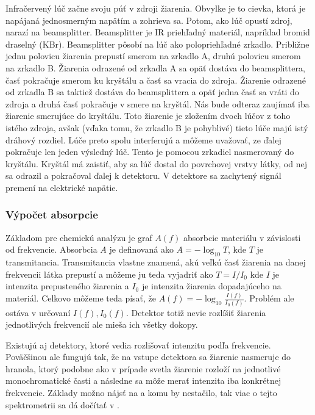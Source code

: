 Infračervený lúč začne svoju púť v zdroji žiarenia. Obvylke je to 
cievka, ktorá je napájaná jednosmerným napätím a zohrieva sa.
Potom, ako lúč opustí zdroj, narazí na beamsplitter. Beamsplitter
je IR priehľadný materiál, napríklad bromid draselný (KBr). 
Beamsplitter pôsobí
na lúč ako polopriehľadné zrkadlo. Približne jednu polovicu žiarenia
prepustí smerom na zrkadlo A, druhú polovicu smerom na zrkadlo B.
Žiarenia odrazené od zrkadla A sa opäť dostáva do beamsplittera,
časť pokračuje smerom ku kryštálu a časť sa vracia do zdroja.
Žiarenie odrazené od zrkadla B sa taktiež dostáva do beamsplittera a
opäť jedna časť sa vráti do zdroja a druhá časť pokračuje v smere na
kryštál. Nás bude odteraz zaujímať iba žiarenie smerujúce do kryštálu.
Toto žiarenie je zložením dvoch lúčov z toho istého zdroja, avšak
(vďaka tomu, že zrkadlo B je pohyblivé) tieto lúče majú istý
dráhový rozdiel. Lúče preto spolu interferujú a môžeme
uvažovať, ze ďalej pokračuje len jeden výsledný lúč.
Tento je pomocou zrkadiel nasmerovaný do kryštálu. Kryštál má zaistiť,
aby sa lúč dostal do povrchovej vrstvy látky, od nej sa odrazil a
pokračoval ďalej k detektoru. V detektore sa zachytený signál
premení na elektrické napätie.


\subsubsection{Výpočet absorpcie}
Základom pre chemickú analýzu je graf $A(f)$ absorbcie materiálu v
závislosti od frekvencie. 
Absorbcia $A$ je definovaná ako
$A=-\log_{10} T$, kde $T$ je transmitancia. Transmitancia vlastne
znamená, akú veľkú časť žiarenia na danej frekvencii látka prepustí
a môžeme ju teda vyjadriť ako $T=I/I_0$ kde $I$ je intenzita
prepusteného žiarenia a $I_0$ je intenzita žiarenia dopadajúceho na
materiál.
Celkovo môžeme teda písať, že $A(f) = -\log_{10} \frac{I(f)}{I_0(f)}$.
Problém ale ostáva v určovaní $I(f), I_0(f)$. Detektor totiž nevie rozlíšiť
žiarenia jednotlivých frekvencií ale mieša ich všetky dokopy.

\begin{poznamka}
 Existujú aj detektory, ktoré vedia rozlišovať intenzitu podľa
 frekvencie. Poväčšinou ale fungujú tak, že na vstupe detektora sa
 žiarenie nasmeruje do hranola, ktorý podobne ako v prípade svetla
 žiarenie rozloží na jednotlivé monochromatické časti a následne
 sa môže merať intenzita iba konkrétnej frekvencie. Základy možno
 nájsť na \cite{wiki:spectrometer} a komu by nestačilo, tak viac o tejto
 spektrometrii sa dá dočítať v \todo{}. 
\end{poznamka}



